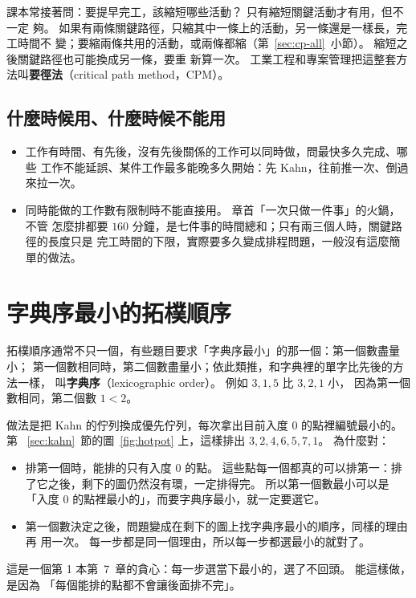 課本常接著問：要提早完工，該縮短哪些活動？ 只有縮短關鍵活動才有用，但不一定
夠。 如果有兩條關鍵路徑，只縮其中一條上的活動，另一條還是一樣長，完工時間不
變；要縮兩條共用的活動，或兩條都縮（第~\ref{sec:cp-all}~小節）。 縮短之後關鍵路徑也可能換成另一條，要重
新算一次。 工業工程和專案管理把這整套方法叫\textbf{要徑法}（critical path
method，CPM）。

\subsection{什麼時候用、什麼時候不能用}

\begin{itemize}
\item 工作有時間、有先後，沒有先後關係的工作可以同時做，問最快多久完成、哪些
工作不能延誤、某件工作最多能晚多久開始：先 Kahn，往前推一次、倒過來拉一次。
\item 同時能做的工作數有限制時不能直接用。 章首「一次只做一件事」的火鍋，不管
怎麼排都要 $160$ 分鐘，是七件事的時間總和；只有兩三個人時，關鍵路徑的長度只是
完工時間的下限，實際要多久變成排程問題，一般沒有這麼簡單的做法。
\end{itemize}

\section{字典序最小的拓樸順序}
\label{sec:lex-topo}

拓樸順序通常不只一個，有些題目要求「字典序最小」的那一個：第一個數盡量小；
第一個數相同時，第二個數盡量小；依此類推，和字典裡的單字比先後的方法一樣，
叫\textbf{字典序}（lexicographic order）。 例如 $3, 1, 5$ 比 $3, 2, 1$ 小，
因為第一個數相同，第二個數 $1 < 2$。

做法是把 Kahn 的佇列換成優先佇列，每次拿出目前入度 $0$ 的點裡編號最小的。 第
~\ref{sec:kahn}~節的圖~\ref{fig:hotpot} 上，這樣排出 $3, 2, 4, 6, 5, 7, 1$。
為什麼對：

\begin{itemize}
\item 排第一個時，能排的只有入度 $0$ 的點。 這些點每一個都真的可以排第一：排
了它之後，剩下的圖仍然沒有環，一定排得完。 所以第一個數最小可以是「入度 $0$
的點裡最小的」，而要字典序最小，就一定要選它。
\item 第一個數決定之後，問題變成在剩下的圖上找字典序最小的順序，同樣的理由再
用一次。 每一步都是同一個理由，所以每一步都選最小的就對了。
\end{itemize}

這是一個第 1 本第~7~章的貪心：每一步選當下最小的，選了不回頭。 能這樣做，是因為
「每個能排的點都不會讓後面排不完」。


